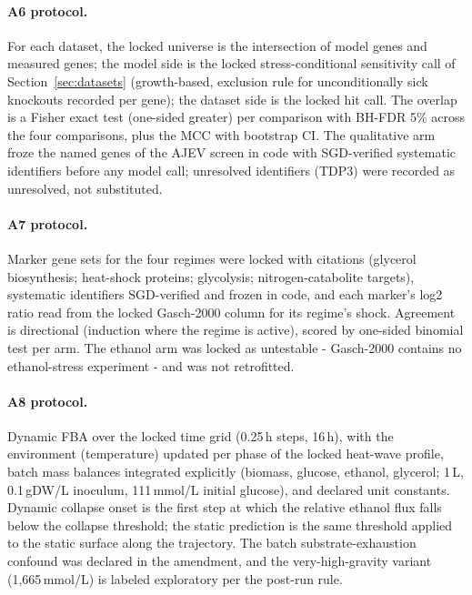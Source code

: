 \documentclass[12pt]{article}
\begin{document}
\paragraph{A6 protocol.} For each dataset, the locked universe is the
intersection of model genes and measured genes; the model side is the
locked stress-conditional sensitivity call of
Section~\ref{sec:datasets} (growth-based, exclusion rule for
unconditionally sick knockouts recorded per gene); the dataset side is
the locked hit call. The overlap is a Fisher exact test (one-sided
greater) per comparison with BH-FDR 5\% across the four comparisons,
plus the MCC with bootstrap CI. The qualitative arm froze the named
genes of the AJEV screen in code with SGD-verified systematic
identifiers before any model call; unresolved identifiers (TDP3) were
recorded as unresolved, not substituted.

\paragraph{A7 protocol.} Marker gene sets for the four regimes were
locked with citations (glycerol biosynthesis; heat-shock proteins;
glycolysis; nitrogen-catabolite targets), systematic identifiers
SGD-verified and frozen in code, and each marker's log2 ratio read
from the locked Gasch-2000 column for its regime's shock. Agreement
is directional (induction where the regime is active), scored by
one-sided binomial test per arm. The ethanol arm was locked as
untestable - Gasch-2000 contains no ethanol-stress experiment - and
was not retrofitted.

\paragraph{A8 protocol.} Dynamic FBA over the locked time grid
(0.25\,h steps, 16\,h), with the environment (temperature) updated
per phase of the locked heat-wave profile, batch mass balances
integrated explicitly (biomass, glucose, ethanol, glycerol; 1\,L,
0.1\,gDW/L inoculum, 111\,mmol/L initial glucose), and declared unit
constants. Dynamic collapse onset is the first step at which the
relative ethanol flux falls below the collapse threshold; the static
prediction is the same threshold applied to the static surface along
the trajectory. The batch substrate-exhaustion confound was declared
in the amendment, and the very-high-gravity variant
(1{,}665\,mmol/L) is labeled exploratory per the post-run rule.
\end{document}
